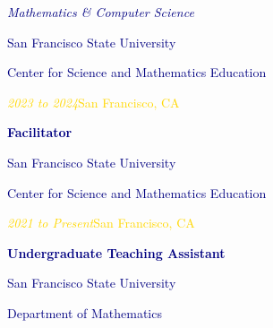 \documentclass[hidelinks, 10pt]{article}
\begin{document}
\begin{textblock}{4}
    \scriptsize\textcolor{navy}{\scriptsize\emph{Mathematics \& Computer Science}}

    \vspace{0.5mm}

    \footnotesize\textcolor{navy}{\scriptsize San Francisco State University}

    \vspace{0.5mm}

    \scriptsize\textcolor{navy}{\scriptsize Center for Science and Mathematics Education}

    \vspace{0.5mm}

    \scriptsize\textcolor{gold}{\scriptsize\emph{2023 to 2024}\hfill San
        Francisco, CA}


    \vspace{1mm}

    \footnotesize\textcolor{navy}{\scriptsize\textbf{Facilitator}}

    \vspace{0.5mm}

    \footnotesize\textcolor{navy}{\scriptsize San Francisco State University}

    \vspace{0.5mm}

    \scriptsize\textcolor{navy}{\scriptsize Center for Science and Mathematics Education}

    \vspace{0.5mm}

    \scriptsize\textcolor{gold}{\scriptsize\emph{2021 to Present}\hfill San
        Francisco, CA}

    \vspace{1mm}

    \footnotesize\textcolor{navy}{\scriptsize\textbf{Undergraduate Teaching Assistant}}

    \vspace{0.5mm}

    \footnotesize\textcolor{navy}{\scriptsize San Francisco State University}

    \vspace{0.5mm}

    \scriptsize\textcolor{navy}{\scriptsize Department of Mathematics}

    \vspace{0.5mm}


\end{textblock}
\end{document}
